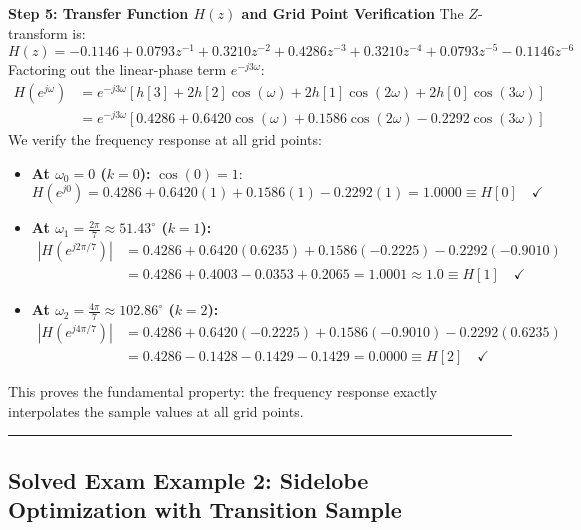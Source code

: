 \documentclass[11pt,a4paper]{article}
\begin{document}
\noindent\textbf{Step 5: Transfer Function $H(z)$ and Grid Point Verification}
The $Z$-transform is:
\begin{equation}
H(z) = -0.1146 + 0.0793 z^{-1} + 0.3210 z^{-2} + 0.4286 z^{-3} + 0.3210 z^{-4} + 0.0793 z^{-5} - 0.1146 z^{-6}
\end{equation}
Factoring out the linear-phase term $e^{-j 3\omega}$:
\begin{align}
H(e^{j\omega}) &= e^{-j 3\omega} \left[ h[3] + 2h[2]\cos(\omega) + 2h[1]\cos(2\omega) + 2h[0]\cos(3\omega) \right] \nonumber \\
&= e^{-j 3\omega} \left[ 0.4286 + 0.6420\cos(\omega) + 0.1586\cos(2\omega) - 0.2292\cos(3\omega) \right]
\end{align}
We verify the frequency response at all grid points:
\begin{itemize}
    \item \textbf{At $\omega_0 = 0$ ($k = 0$):} $\cos(0) = 1$:
    \begin{equation}
    H(e^{j0}) = 0.4286 + 0.6420(1) + 0.1586(1) - 0.2292(1) = \mathbf{1.0000} \equiv H[0] \quad \checkmark
    \end{equation}
    \item \textbf{At $\omega_1 = \frac{2\pi}{7} \approx 51.43^\circ$ ($k = 1$):}
    \begin{align}
    |H(e^{j 2\pi/7})| &= 0.4286 + 0.6420(0.6235) + 0.1586(-0.2225) - 0.2292(-0.9010) \nonumber \\
    &= 0.4286 + 0.4003 - 0.0353 + 0.2065 = \mathbf{1.0001} \approx 1.0 \equiv H[1] \quad \checkmark
    \end{align}
    \item \textbf{At $\omega_2 = \frac{4\pi}{7} \approx 102.86^\circ$ ($k = 2$):}
    \begin{align}
    |H(e^{j 4\pi/7})| &= 0.4286 + 0.6420(-0.2225) + 0.1586(-0.9010) - 0.2292(0.6235) \nonumber \\
    &= 0.4286 - 0.1428 - 0.1429 - 0.1429 = \mathbf{0.0000} \equiv H[2] \quad \checkmark
    \end{align}
\end{itemize}
This proves the fundamental property: the frequency response exactly interpolates the sample values at all grid points.

\noindent\rule{\textwidth}{0.5pt}

\subsection*{Solved Exam Example 2: Sidelobe Optimization with Transition Sample}
\end{document}
